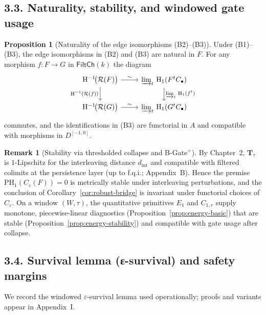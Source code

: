 \documentclass[11pt]{article}
\numberwithin{equation}{section}
\theoremstyle{plain}
\theoremstyle{definition}
\theoremstyle{remark}
\newcommand{\rH}{\mathrm{H}}
\theoremstyle{plain}
\theoremstyle{definition}
\numberwithin{equation}{section}
\newtheorem{proposition}[theorem]{Proposition}
\theoremstyle{definition}
\newtheorem{remark}[theorem]{Remark}
\numberwithin{equation}{section}
\theoremstyle{plain}
\theoremstyle{definition}
\theoremstyle{remark}
\providecommand{\n}{\unskip\space}
\begin{document}
\subsection*{3.3. Naturality, stability, and windowed gate usage}
\begin{proposition}[Naturality of the edge isomorphisms (B2)–(B3)]
Under \textup{(B1)}–\textup{(B3)}, the edge isomorphisms in \textup{(B2)} and \textup{(B3)} are natural in \(F\). For any morphism \(f:F\to G\) in \(\mathsf{FiltCh}(k)\) the diagram
\[
\begin{tikzcd}\n\rH^{-1}\!\big(\mathcal{R}(F)\big) \arrow[r,"\sim"] \arrow[d,"\rH^{-1}(\mathcal{R}(f))"'] &\n\varinjlim_t \,\rH_1(F^tC_\bullet) \arrow[d,"\varinjlim_t\, \rH_1(f^t)"] \\\n\rH^{-1}\!\big(\mathcal{R}(G)\big) \arrow[r,"\sim"] &\n\varinjlim_t \,\rH_1(G^tC_\bullet)\n\end{tikzcd}
\]
commutes, and the identifications in \textup{(B3)} are functorial in \(A\) and compatible with morphisms in \(D^{[-1,0]}\).
\end{proposition}

\begin{remark}[Stability via thresholded collapse and B-Gate\(^{+}\)]
By Chapter~2, \(\mathbf{T}_\tau\) is \(1\)-Lipschitz for the interleaving distance \(d_{\mathrm{int}}\) and compatible with filtered colimits at the persistence layer (up to f.q.i.; Appendix~B). Hence the premise \(\mathrm{PH}_1(C_\varepsilon(F))=0\) is metrically stable under interleaving perturbations, and the conclusion of Corollary~\ref{cor:robust-bridge} is invariant under functorial choices of \(C_\varepsilon\). On a window \((W,\tau)\), the quantitative primitives \(E_1\) and \(C_{1,r}\) supply monotone, piecewise-linear diagnostics (Proposition~\ref{prop:energy-basic}) that are stable (Proposition~\ref{prop:energy-stability}) and compatible with gate usage after collapse.
\end{remark}

\subsection*{3.4. Survival lemma (ε-survival) and safety margins}
We record the windowed \(\varepsilon\)-survival lemma used operationally; proofs and variants appear in Appendix~I.
\end{document}
